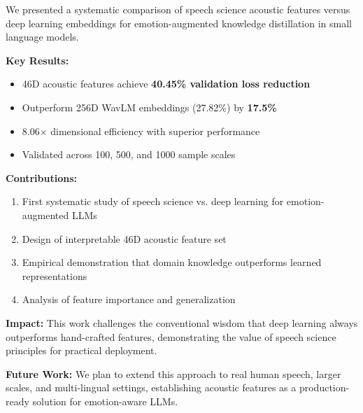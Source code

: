 
We presented a systematic comparison of speech science acoustic features versus deep learning embeddings for emotion-augmented knowledge distillation in small language models.

\textbf{Key Results:}
\begin{itemize}
    \item 46D acoustic features achieve \textbf{40.45\% validation loss reduction}
    \item Outperform 256D WavLM embeddings (27.82\%) by \textbf{17.5\%}
    \item 8.06$\times$ dimensional efficiency with superior performance
    \item Validated across 100, 500, and 1000 sample scales
\end{itemize}

\textbf{Contributions:}
\begin{enumerate}
    \item First systematic study of speech science vs. deep learning for emotion-augmented LLMs
    \item Design of interpretable 46D acoustic feature set
    \item Empirical demonstration that domain knowledge outperforms learned representations
    \item Analysis of feature importance and generalization
\end{enumerate}

\textbf{Impact:}
This work challenges the conventional wisdom that deep learning always outperforms hand-crafted features, demonstrating the value of speech science principles for practical deployment.

\textbf{Future Work:}
We plan to extend this approach to real human speech, larger scales, and multi-lingual settings, establishing acoustic features as a production-ready solution for emotion-aware LLMs.
